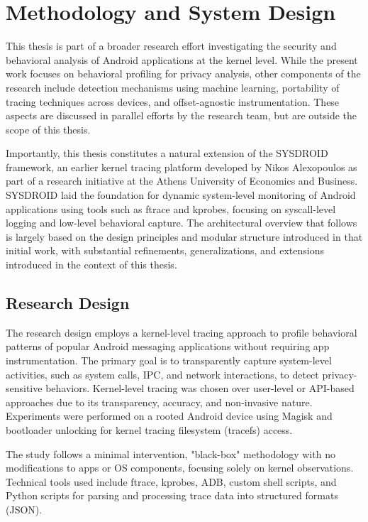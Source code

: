 \documentclass[a4paper,12pt]{report}
\begin{document}
\chapter{Methodology and System Design}

This thesis is part of a broader research effort investigating the security and behavioral analysis of Android applications at the kernel level. While the present work focuses on behavioral profiling for privacy analysis, other components of the research include detection mechanisms using machine learning, portability of tracing techniques across devices, and offset-agnostic instrumentation. These aspects are discussed in parallel efforts by the research team, but are outside the scope of this thesis.

Importantly, this thesis constitutes a natural extension of the SYSDROID framework, an earlier kernel tracing platform developed by Nikos Alexopoulos as part of a research initiative at the Athens University of Economics and Business. SYSDROID laid the foundation for dynamic system-level monitoring of Android applications using tools such as ftrace and kprobes, focusing on syscall-level logging and low-level behavioral capture. The architectural overview that follows is largely based on the design principles and modular structure introduced in that initial work, with substantial refinements, generalizations, and extensions introduced in the context of this thesis.

\section{Research Design}
The research design employs a kernel-level tracing approach to profile behavioral patterns of popular Android messaging applications without requiring app instrumentation. The primary goal is to transparently capture system-level activities, such as system calls, IPC, and network interactions, to detect privacy-sensitive behaviors.
Kernel-level tracing was chosen over user-level or API-based approaches due to its transparency, accuracy, and non-invasive nature. Experiments were performed on a rooted Android device using Magisk and bootloader unlocking for kernel tracing filesystem (tracefs) access.

The study follows a minimal intervention, "black-box" methodology with no modifications to apps or OS components, focusing solely on kernel observations. Technical tools used include ftrace, kprobes, ADB, custom shell scripts, and Python scripts for parsing and processing trace data into structured formats (JSON).
\end{document}

